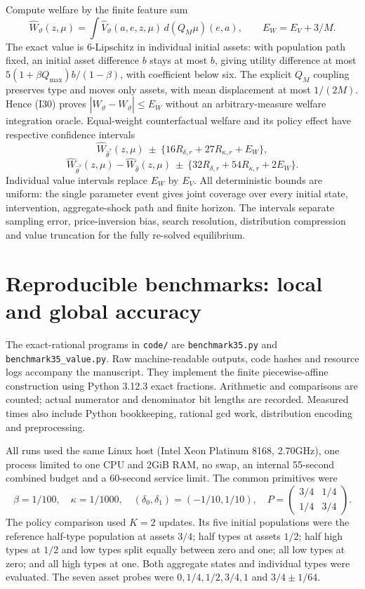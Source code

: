 \documentclass[11pt,a4paper]{article}
\begin{document}
Compute welfare by the finite feature sum
\[
 \widehat W_\vartheta(z,\mu)=
 \int\widehat V_\vartheta(a,e,z,\mu)\,d(Q_M\mu)(e,a),\qquad
 E_W=E_V+3/M.                                               \tag{I32}
\]
The exact value is $6$-Lipschitz in individual initial assets: with population
path fixed, an initial asset difference $b$ stays at most $b$, giving utility
difference at most $5(1+\beta Q_{\max})b/(1-\beta)$, with coefficient below six. The explicit
$Q_M$ coupling preserves type and moves only assets, with mean displacement
at most $1/(2M)$. Hence \textup{(I30)} proves
$|\widehat W_\vartheta-W_\vartheta|\leq E_W$ without an arbitrary-measure
welfare integration oracle. Equal-weight counterfactual welfare and its policy
effect have respective confidence intervals
\[
 \widehat W_{\widehat\theta^\tau}(z,\mu)
 \ \pm\ \{16R_{\delta,r}+27R_{\kappa,r}+E_W\},               \tag{I33}
\]
\[
 \widehat W_{\widehat\theta^\tau}(z,\mu)-\widehat W_{\widehat\theta}(z,\mu)
 \ \pm\ \{32R_{\delta,r}+54R_{\kappa,r}+2E_W\}.              \tag{I34}
\]
Individual value intervals replace $E_W$ by $E_V$. All deterministic bounds
are uniform: the single parameter event gives joint coverage over every initial
state, intervention, aggregate-shock path and finite horizon. The intervals
separate sampling error, price-inversion bias, search resolution, distribution
compression and value truncation for the fully re-solved equilibrium.


\section{Reproducible benchmarks: local and global accuracy}
\label{sec:benchmarks}
The exact-rational programs in \texttt{code/} are
\texttt{benchmark35.py} and \texttt{benchmark35\_value.py}.
Raw machine-readable outputs,
code hashes and resource logs accompany the manuscript. They implement
the finite piecewise-affine construction using Python 3.12.3 exact fractions.
Arithmetic and comparisons are counted; actual numerator and denominator
bit lengths are recorded. Measured times also include Python bookkeeping,
rational gcd work, distribution encoding and preprocessing.

All runs used the same Linux host (Intel Xeon Platinum 8168, 2.70GHz),
one process limited to one CPU and 2GiB RAM, no swap, an internal
55-second combined budget and a 60-second service limit. The common primitives were
\[
 \beta=1/100,\quad\kappa=1/1000,\quad
 (\delta_0,\delta_1)=(-1/10,1/10),\quad
 P=\begin{pmatrix}3/4&1/4\\1/4&3/4\end{pmatrix}.
\]
The policy comparison used $K=2$ updates. Its five initial populations
were the reference half-type population at assets $3/4$; half types at
assets $1/2$; half high types at $1/2$ and low types split equally between
zero and one; all low types at zero; and all high types at one.
Both aggregate states and individual types were evaluated. The seven
asset probes were $0,1/4,1/2,3/4,1$ and $3/4\pm1/64$.
\end{document}
